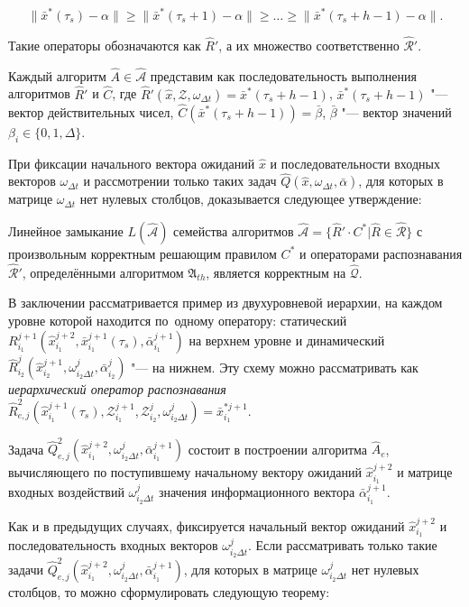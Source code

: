 \[
\|\bar x^*(\tau_s)-\alpha\|\geqslant \|\bar x^*(\tau_s+1)-\alpha\|\geqslant \dots\geqslant\|\bar x^*(\tau_s+h-1)-\alpha\|.
\]

Такие операторы обозначаются как $\hat R'$, а их множество соответственно $\hat{\mathcal R}'$. 

\begin{Pred}\label{st:decompositon_dyn}
	Каждый алгоритм $\hat{ A}\in\hat{\mathcal{A}}$ представим как последовательность выполнения алгоритмов $\hat R'$ и $\hat{C}$, где $\hat R'(\hat x, \mathcal{Z}, \omega_{\Delta{t}})=\bar x^*(\tau_s+h-1)$, $\bar x^*(\tau_s+h-1)$ "--- вектор действительных чисел, $\hat C(\bar x^*(\tau_s+h-1))=\bar\beta$, $\bar\beta$ "--- вектор значений $\beta_i\in\{0,1,\Delta\}$.
\end{Pred}

При фиксации начального вектора ожиданий $\hat{x}$ и последовательности входных векторов $\omega_{\Delta{t}}$ и рассмотрении только таких задач $\hat{Q}(\hat{x},\omega_{\Delta{t}},\bar{\alpha})$, для которых в матрице $\omega_{\Delta{t}}$ нет нулевых столбцов, доказывается следующее утверждение:
\begin{Theorem}\label{th:dyn_correct}
	Линейное замыкание $L(\hat{\mathcal A})$ семейства алгоритмов $\hat{\mathcal A}=\{\hat R'{\cdot}C^*|\hat R\in\hat{\mathcal R}\}$ с произвольным корректным решающим правилом $C^*$ и операторами распознавания $\hat{\mathcal R}'$, определёнными алгоритмом $\mathfrak{A}_{th}$, является корректным на $\hat{\mathcal Q}$.
\end{Theorem}

В заключении рассматривается пример из двухуровневой иерархии, на каждом уровне которой находится по~одному оператору: статический $R_{i_1}^{j+1}(\hat x _{i_1}^{j+2},\bar x_{i_1}^{j+1}(\tau_s),\bar\alpha_{i_1}^{j+1})$ на верхнем уровне и динамический $\hat R_{i_2}^j(\hat x _{i_2}^{j+1},\omega_{i_2\Delta t}^j,\bar\alpha_{i_2}^j)$ "--- на нижнем. Эту схему можно рассматривать как \textit{иерархический оператор распознавания} $\hat R_{e,j}^2(\hat x_{i_1}^{j+1}(\tau_s),\mathcal Z_{i_1}^{j+1},\mathcal Z_{i_2}^j,\omega_{i_2\Delta t}^j)=\bar x_{i_1}^{*j+1}$.

Задача $\hat Q_{e,j}^2(\hat x_{i_1}^{j+2},\omega_{i_2\Delta t}^j,\bar\alpha_{i_1}^{j+1})$ состоит в построении алгоритма $\hat A_e$, вычисляющего по поступившему начальному вектору ожиданий $\hat x_{i_1}^{j+2}$ и матрице входных воздействий $\omega_{i_2\Delta t}^j$ значения информационного вектора $\bar\alpha_{i_1}^{j+1}$.

Как и в предыдущих случаях, фиксируется начальный вектор ожиданий $\hat x_{i_1}^{j+2}$ и последовательность входных векторов $\omega_{i_2\Delta{t}}^j$. Если рассматривать только такие задачи $\hat Q_{e,j}^2(\hat x_{i_1}^{j+2},\omega_{i_2\Delta{t}}^j,\bar\alpha_{i_1}^{j+1})$, для которых в матрице $\omega_{i_2\Delta{t}}^j$ нет нулевых столбцов, то можно сформулировать следующую теорему:

